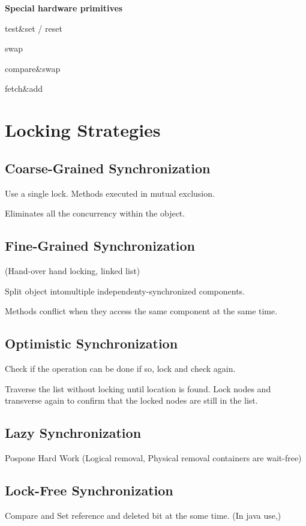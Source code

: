 \textbf{Special hardware primitives}\par

test\&set / reset \par
swap \par
compare\&swap\par
fetch\&add

\section{Locking Strategies}

\subsection{Coarse-Grained Synchronization}
Use a single lock. Methods executed in mutual exclusion.\par
Eliminates all the concurrency within the object.

\subsection{Fine-Grained Synchronization}
(Hand-over hand locking, linked list)\par
Split object intomultiple independenty-synchronized components.\par
Methods conflict when they access the same component at the same time.

\subsection{Optimistic Synchronization}
Check if the operation can be done if so, lock and check again.\par
Traverse the list without locking until location is found. Lock nodes and transverse again to confirm that the locked nodes are still in the list.

\subsection{Lazy Synchronization}
Pospone Hard Work (Logical removal, Physical removal containers are wait-free)

\subsection{Lock-Free Synchronization}
Compare and Set reference and deleted bit at the some time. (In java use,)